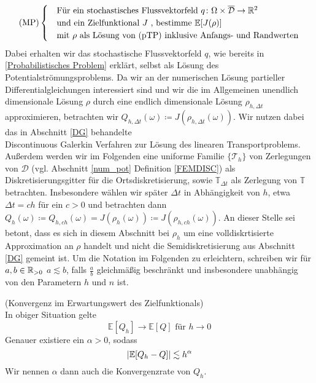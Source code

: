 \begin{align}
\text{(MP)}
\begin{cases}
\label{Modellproblem}
&\text{Für ein stochastisches Flussvektorfeld } q \colon \Omega \times \overline{\mathcal{D}} \to \mathbb{R}^2 \\
&\text{und ein Zielfunktional } J \text{ , bestimme }  \mathbb{E}[J(\rho)]  \\
&\text{mit } \rho \text{ als Lösung von (pTP) inklusive Anfangs- und Randwerten}
\end{cases}
\end{align} 
Dabei erhalten wir das stochastische Flussvektorfeld $ q $, wie bereits in \ref{Probabilistisches Problem} erklärt, selbst als Lösung des Potentialströmungsproblems.
Da wir an der numerischen Lösung partieller Differentialgleichungen interessiert sind und wir die im Allgemeinen unendlich dimensionale Lösung $ \rho $ durch eine endlich dimensionale Lösung $ \rho_{h,\Delta t} $ approximieren, betrachten wir $ Q_{h,\Delta t}(\omega) \coloneqq J(\rho_{h,\Delta t}(\omega )) $.
Wir nutzen dabei das in Abschnitt \ref{DG} behandelte \\ Discontinuous Galerkin Verfahren zur Lösung des linearen Transportproblems. Außerdem werden wir im Folgenden eine uniforme Familie $ \{ \mathcal{T}_h \} $ von Zerlegungen von $ \mathcal{D} $ (vgl. Abschnitt \ref{num_pot} Definition \ref{FEMDISC}) als Diskretisierungsgitter für die Ortsdiskretisierung, sowie $ \mathbb{T}_{\Delta t} $ als Zerlegung von $ \mathbb{T} $ betrachten.
Insbesondere wählen wir später $ \Delta t $ in Abhängigkeit von $ h $, etwa $ \Delta t = c  h $ für ein $ c>0 $ und betrachten dann
$ Q_h(\omega) \coloneqq Q_{h,ch}(\omega) = J(\rho_h(\omega )) \coloneqq J(\rho_{h,ch}(\omega )) $.
An dieser Stelle sei betont, dass es sich in diesem Abschnitt bei $ \rho_h $ um eine volldiskrtisierte Approximation an $ \rho $ handelt und nicht die Semidiskretisierung aus Abschnitt \ref{DG} gemeint ist. Um die Notation im Folgenden zu erleichtern, schreiben wir für $ a,b \in \mathbb{R}_{> 0} $ $ a \lesssim b $, falls $\frac{a}{b}$ gleichmäßig beschränkt und insbesondere unabhängig von den Parametern $ h $ und $ n $ ist.
\begin{Annahme}(Konvergenz im Erwartungswert des Zielfunktionals)\\
	\label{Annahme1}
	In obiger Situation gelte 
	\[ 
	\mathbb{E}[Q_h] \to \mathbb{E}[Q] \text{ für } h \to 0   
	\]
	Genauer existiere ein $ \alpha > 0 $, sodass
	\[
		| \mathbb{E}[Q_h-Q] | \lesssim h^{\alpha}
	\]
	Wir nennen $ \alpha $ dann auch die Konvergenzrate von $ Q_h $.
\end{Annahme}



